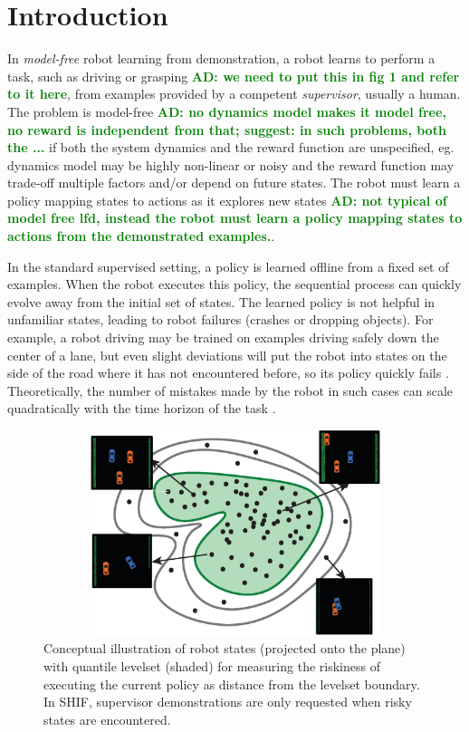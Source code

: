 \documentclass[10pt, conference]{ieeeconf}      %
\newcommand{\adnote}[1]{\ifthenelse{\boolean{include-notes}}%
 {\textcolor{green}{\textbf{AD: #1}}}{}}
\begin{document}

\section{Introduction} 


In \emph{model-free} robot learning from demonstration, a robot learns to perform a task, such as driving or grasping \adnote{we need to put this in fig 1 and refer to it here}, from examples provided by a competent \emph{supervisor}, usually a human. The problem is model-free\adnote{no dynamics model makes it model free, no reward is independent from that; suggest: in such problems, both the ...} if both the system dynamics and the reward function are unspecified, eg. dynamics model may be highly non-linear or noisy and the reward function may trade-off multiple factors and/or depend on future states.  The robot must learn a policy mapping states to actions as it explores new states \adnote{not typical of model free lfd, instead the robot must learn a policy mapping states to actions from the demonstrated examples.}\cite{argall2009survey}.

In the standard supervised setting, a policy is learned offline from a fixed set of examples. When the robot executes this policy, the sequential process can quickly evolve away from the initial set of states.  The learned policy is not helpful in unfamiliar states, leading to robot failures (crashes or dropping objects).  For example, a robot driving may be trained on examples driving safely down the center of a lane, but even slight deviations will put the robot into states on the side of the road where it has not encountered before, so its policy quickly fails \cite{pomerleau1989alvinn}. Theoretically, the number of mistakes made by the robot in such cases  can scale quadratically with the time horizon of the task \cite{ross2010efficient}.


\begin{figure}[t!]
\centering
\includegraphics[width=12cm, height=6cm]{figures/teaser.eps}
\caption{ 
Conceptual illustration of robot states (projected onto the plane) with quantile levelset (shaded) for measuring the riskiness of
executing the current policy as distance from the levelset boundary.  In SHIF, supervisor demonstrations are only requested when risky states are encountered. 
}
\vspace*{-10pt}
\label{fig:dis_traveled}
\end{figure}
\end{document}
